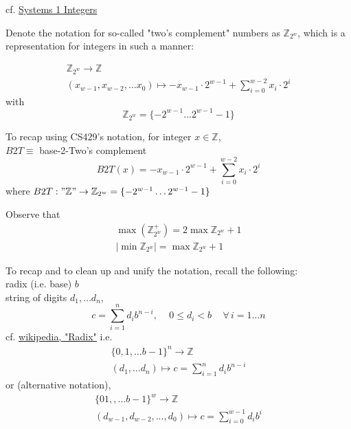 \documentclass[10pt]{amsart}
\begin{document}
cf. \href{https://www.cs.utexas.edu/users/fussell/courses/cs429h/lectures/Lecture_3-429h.pdf}{Systems 1 Integers}

Denote the notation for so-called "two's complement" numbers as $\mathbb{Z}_{2^w}$, which is a representation for integers in such a manner:

\begin{equation}
\begin{gathered}
\mathbb{Z}_{2^w} \to \mathbb{Z} \\
(x_{w-1}, x_{w-2}, \dots x_0) \mapsto -x_{w-1} \cdot 2^{w-1} + \sum_{i=0}^{w-2} x_i \cdot 2^i
\end{gathered}
\end{equation}
with
\begin{equation}
\mathbb{Z}_{2^w} = \lbrace - 2^{w-1} \dots 2^{w-1} -1 \rbrace
\end{equation}

To recap using CS429's notation, for integer $x \in \mathbb{Z}$, \\
$B2T \equiv $ base-2-Two's complement \\
\[
B2T(x) = -x_{w-1} \cdot 2^{w-1} + \sum_{i=0}^{w-2} x_i \cdot 2^i
\]
where $B2T: "\mathbb{Z}" \to \mathbb{Z}_{2^w} = \lbrace -2^{w-1} \dots 2^{w-1} - 1 \rbrace$


Observe that 
\begin{equation}
\begin{gathered}
\max{ \left( \mathbb{Z}^+_{2^w} \right) } = 2 \max{ \mathbb{Z}_{2^w} } + 1 \\
| \min{ \mathbb{Z}_{2^w} } | = \max{ \mathbb{Z}_{2^w} } + 1
\end{gathered}
\end{equation}

To recap and to clean up and unify the notation, recall the following: \\
radix (i.e. base) $b$ \\
string of digits $d_1, \dots d_n$, 
\[
c = \sum_{i=1}^n d_i b^{n-i} , \quad \, 0 \leq d_i < b \quad \, \forall \, i = 1 \dots n
\]
cf. \href{https://en.wikipedia.org/wiki/Radix}{wikipedia, "Radix"}
i.e.
\[
\begin{gathered}
\lbrace 0 ,1 ,\dots b-1 \rbrace^n \to \mathbb{Z} \\ 
(d_1, \dots d_n) \mapsto c = \sum_{i=1}^n d_i b^{n-i}
\end{gathered}
\]
or (alternative notation),
\[
\begin{gathered}
\lbrace 0 1, ,\dots b-1 \rbrace^w \to \mathbb{Z} \\ 
(d_{w-1}, d_{w-2}, \dots, d_0) \mapsto c = \sum_{i=0}^{w-1} d_i b^i 
\end{gathered}
\]
\end{document}
